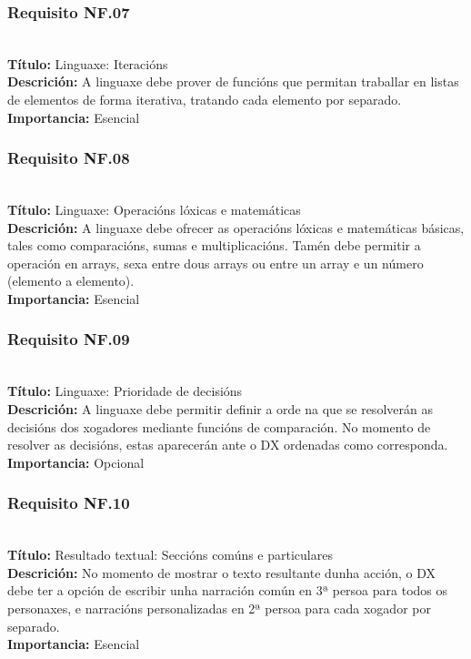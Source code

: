 \subsubsection{Requisito NF.07}~\\
{\bf Título:} Linguaxe: Iteracións\\
{\bf Descrición:} A linguaxe debe prover de funcións que permitan traballar en
listas de elementos de forma iterativa, tratando cada elemento por separado.\\
{\bf Importancia:} Esencial

\subsubsection{Requisito NF.08}~\\
{\bf Título:} Linguaxe: Operacións lóxicas e matemáticas\\
{\bf Descrición:} A linguaxe debe ofrecer as operacións lóxicas e matemáticas
básicas, tales como comparacións, sumas e multiplicacións. Tamén debe permitir
a operación en arrays, sexa entre dous arrays ou entre un array e un número
(elemento a elemento).\\
{\bf Importancia:} Esencial

\subsubsection{Requisito NF.09}~\\
{\bf Título:} Linguaxe: Prioridade de decisións\\
{\bf Descrición:} A linguaxe debe permitir definir a orde na que se resolverán
as decisións dos xogadores mediante funcións de comparación. No momento de
resolver as decisións, estas aparecerán ante o DX ordenadas como corresponda.\\
{\bf Importancia:} Opcional

\subsubsection{Requisito NF.10}~\\
{\bf Título:} Resultado textual: Seccións comúns e particulares\\
{\bf Descrición:} No momento de mostrar o texto resultante dunha acción, o DX
debe ter a opción de escribir unha narración común en 3ª persoa para todos os
personaxes, e narracións personalizadas en 2ª persoa para cada xogador por separado.\\
{\bf Importancia:} Esencial


